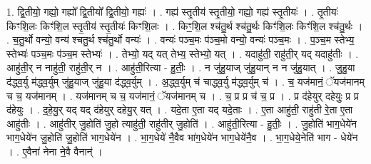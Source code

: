 \documentclass[17pt]{extarticle}
\begin{document}
1. द्वि॒तीयो॒ गह्यो॒ गह्यो᳚ द्वि॒तीयो᳚ द्वि॒तीयो॒ गह्यः॑ । . गह्य॑ स्तृ॒तीय॑ स्तृ॒तीयो॒ गह्यो॒ गह्य॑ स्तृ॒तीयः॑ । . तृ॒तीयः॑ किꣳशि॒लः किꣳ॑शि॒ल स्तृ॒तीय॑ स्तृ॒तीयः॑ किꣳशि॒लः । . किꣳ॒॒शि॒ल श्च॑तु॒र्थ श्च॑तु॒र्थः किꣳ॑शि॒लः किꣳ॑शि॒ल श्च॑तु॒र्थः । . च॒तु॒र्थो वन्यो॒ वन्य॑ श्चतु॒र्थ श्च॑तु॒र्थो वन्यः॑ । . वन्यः॑ पञ्च॒मः प॑ञ्च॒मो वन्यो॒ वन्यः॑ पञ्च॒मः । . प॒ञ्च॒म स्तेभ्य॒ स्तेभ्यः॑ पञ्च॒मः प॑ञ्च॒म स्तेभ्यः॑ । . तेभ्यो॒ यद् यत् तेभ्य॒ स्तेभ्यो॒ यत् । . यदाहु॑ती॒ राहु॑ती॒र् यद् यदाहु॑तीः । . आहु॑ती॒र् न नाहु॑ती॒ राहु॑ती॒र् न । . आहु॑ती॒रित्या - हु॒तीः॒ । . न जु॑हु॒याज् जु॑हु॒यान् न न जु॑हु॒यात् । . जु॒हु॒या द॑द्ध्व॒र्यु म॑द्ध्व॒र्युम् जु॑हु॒याज् जु॑हु॒या द॑द्ध्व॒र्युम् । . अ॒द्ध्व॒र्युम् च॑ चाद्ध्व॒र्यु म॑द्ध्व॒र्युम् च॑ । . च॒ यज॑मानं॒ ॅयज॑मानम् च च॒ यज॑मानम् । . यज॑मानम् च च॒ यज॑मानं॒ ॅयज॑मानम् च । . च॒ प्र प्र च॑ च॒ प्र । . प्र द॑हेयुर् दहेयुः॒ प्र प्र द॑हेयुः । . द॒हे॒यु॒र् यद् यद् द॑हेयुर् दहेयु॒र् यत् । . यदे॒ता ए॒ता यद् यदे॒ताः । . ए॒ता आहु॑ती॒ राहु॑ती रे॒ता ए॒ता आहु॑तीः । . आहु॑तीर् जु॒होति॑ जु॒हो त्याहु॑ती॒ राहु॑तीर् जु॒होति॑ । . आहु॑ती॒रित्या - हु॒तीः॒ । . जु॒होति॑ भाग॒धेये॑न भाग॒धेये॑न जु॒होति॑ जु॒होति॑ भाग॒धेये॑न । . भा॒ग॒धेये॑ नै॒वैव भा॑ग॒धेये॑न भाग॒धेये॑नै॒व । . भा॒ग॒धेये॒नेति॑ भाग - धेये॑न । . ए॒वैना॑ नेना ने॒वै वैनान्॑ । \newline
\end{document}
